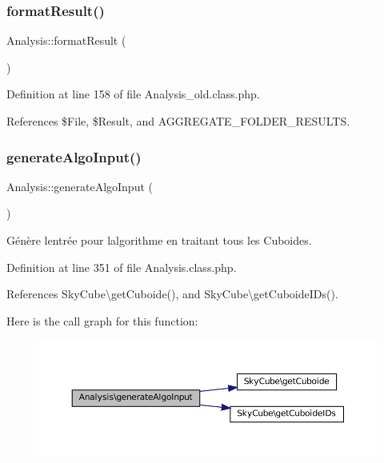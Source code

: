 \mbox{\label{class_analysis_a34fc5d25df77ec67c0183d3b59868e0b}} 
\subsubsection{\texorpdfstring{format\+Result()}{formatResult()}}
{\footnotesize\ttfamily Analysis\+::format\+Result (\begin{DoxyParamCaption}{ }\end{DoxyParamCaption})}



Definition at line 158 of file Analysis\+\_\+old.\+class.\+php.



References \$\+File, \$\+Result, and A\+G\+G\+R\+E\+G\+A\+T\+E\+\_\+\+F\+O\+L\+D\+E\+R\+\_\+\+R\+E\+S\+U\+L\+TS.

\mbox{\label{class_analysis_a6a342ad151dc1807858480b8f024cddf}} 
\subsubsection{\texorpdfstring{generate\+Algo\+Input()}{generateAlgoInput()}}
{\footnotesize\ttfamily Analysis\+::generate\+Algo\+Input (\begin{DoxyParamCaption}{ }\end{DoxyParamCaption})\hspace{0.3cm}{\ttfamily [protected]}}

Génère l\textquotesingle{}entrée pour l\textquotesingle{}algorithme en traitant tous les Cuboides. 

Definition at line 351 of file Analysis.\+class.\+php.



References Sky\+Cube\textbackslash{}get\+Cuboide(), and Sky\+Cube\textbackslash{}get\+Cuboide\+I\+Ds().

Here is the call graph for this function\+:\nopagebreak
\begin{figure}[H]
\begin{center}
\leavevmode
\includegraphics[width=350pt]{class_analysis_a6a342ad151dc1807858480b8f024cddf_cgraph}
\end{center}
\end{figure}
\mbox{\label{class_analysis_a3a36df8e0acaa0d84d66483f395a913c}} 
